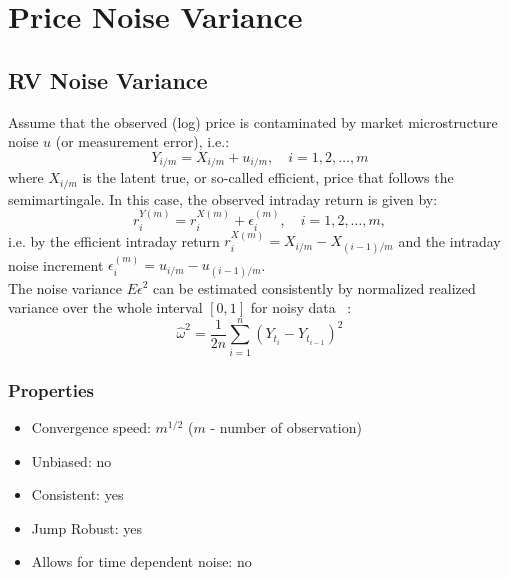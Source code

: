 \documentclass[letterpaper]{report}
\newcounter{N}
\begin{document}
\chapter{Price Noise Variance}
\thispagestyle{plain}
\section{RV Noise Variance}
Assume that the observed (log) price is contaminated by market microstructure
noise $u$ (or measurement error), i.e.:
\begin{equation}
Y_{i/m} = X_{i/m} + u_{i/m}, \quad i = 1,2,\ldots, m
\end{equation}
where $X_{i/m}$ is the latent true, or so-called efficient, price that follows
the semimartingale. In this case, the observed intraday return is given
by:
\begin{equation}
r_i^{Y(m)} = r_i^{X(m)} + \epsilon_{i}^{(m)}, \quad i= 1,2,\ldots, m,
\end{equation}
i.e. by the efficient intraday return $r_i^{X(m)} = X_{i/m} - X_{(i-1)/m}$ and the intraday
noise increment $\epsilon_i^{(m)} = u_{i/m} - u_{(i-1)/m}$.\\

\noindent The noise variance $E\epsilon^2$ can be estimated consistently by normalized
realized variance over the whole interval $[0,1]$ for noisy data
~\cite[Zhang et al., 2005]{Zhang_Mykland_Ait-Sahalia}:
\begin{equation}
\label{Noise_Variance}
\hat{\omega}^2=\frac{1}{2n}\sum_{i=1}^{n} (Y_{t_i} - Y_{t_{i-1}})^2
\end{equation}
\subsection{Properties}
\begin{itemize}
\item Convergence speed: $m^{1/2}$ ($m$ - number of observation)
\item Unbiased: no
\item Consistent: yes
\item Jump Robust: yes
\item Allows for time dependent noise: no
\end{itemize}
\end{document}
